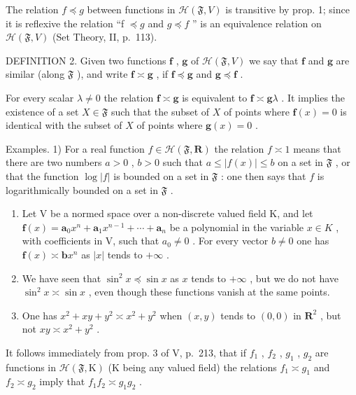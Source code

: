 The relation \(f \preccurlyeq g\) between functions in \(\mathcal{H}(\mathfrak{F}, V)\) is transitive by prop. 1; since it is reflexive the relation ``f \(\preccurlyeq g\) and \(g \preccurlyeq f\) '' is an equivalence relation on \(\mathcal{H}(\mathfrak{F}, V)\) (Set Theory, II, p.~113).

DEFINITION 2. Given two functions \(\mathbf{f}\) , \(\mathbf{g}\) of \(\mathcal{H}(\mathfrak{F}, V)\) we say that \(\mathbf{f}\) and \(\mathbf{g}\) are similar (along \(\mathfrak{F}\) ), and write \(\mathbf{f} \asymp \mathbf{g}\) , if \(\mathbf{f} \preccurlyeq \mathbf{g}\) and \(\mathbf{g} \preccurlyeq \mathbf{f}\) .

For every scalar \(\lambda \neq 0\) the relation \(\mathbf{f} \asymp \mathbf{g}\) is equivalent to \(\mathbf{f} \asymp \mathbf{g}\lambda\) . It implies the existence of a set \(X \in \mathfrak{F}\) such that the subset of \(X\) of points where \(\mathbf{f}(x) = 0\) is identical with the subset of \(X\) of points where \(\mathbf{g}(x) = 0\) .

Examples. 1) For a real function \(f \in \mathcal{H}(\mathfrak{F}, \mathbf{R})\) the relation \(f \asymp 1\) means that there are two numbers \(a > 0\) , \(b > 0\) such that \(a \leqslant |f(x)| \leqslant b\) on a set in \(\mathfrak{F}\) , or that the function \(\log |f|\) is bounded on a set in \(\mathfrak{F}\) : one then says that \(f\) is logarithmically bounded on a set in \(\mathfrak{F}\) .

\begin{enumerate}
\def\labelenumi{\arabic{enumi})}
\setcounter{enumi}{1}
\item
  Let V be a normed space over a non-discrete valued field K, and let \(\mathbf{f}(x)=\mathbf{a}_{0}x^{n}+\mathbf{a}_{1}x^{n-1}+\cdots+\mathbf{a}_{n}\) be a polynomial in the variable \(x\in K\) , with coefficients in V, such that \(a_{0}\neq0\) . For every vector \(b\neq0\) one has \(\mathbf{f}(x)\asymp\mathbf{b}x^{n}\) as \(|x|\) tends to \(+\infty\) .
\item
  We have seen that \(\sin^2 x \preccurlyeq \sin x\) as \(x\) tends to \(+\infty\) , but we do not have \(\sin^2 x \asymp \sin x\) , even though these functions vanish at the same points.
\item
  One has \(x^{2} + xy + y^{2} \asymp x^{2} + y^{2}\) when \((x, y)\) tends to \((0, 0)\) in \(\mathbf{R}^2\) , but not \(xy \asymp x^{2} + y^{2}\) .
\end{enumerate}

It follows immediately from prop. 3 of V, p.~213, that if \(f_1\) , \(f_2\) , \(g_1\) , \(g_2\) are functions in \(\mathcal{H}(\mathfrak{F},\mathrm{K})\) (K being any valued field) the relations \(f_1 \asymp g_1\) and \(f_2 \asymp g_2\) imply that \(f_1f_2 \asymp g_1g_2\) .

